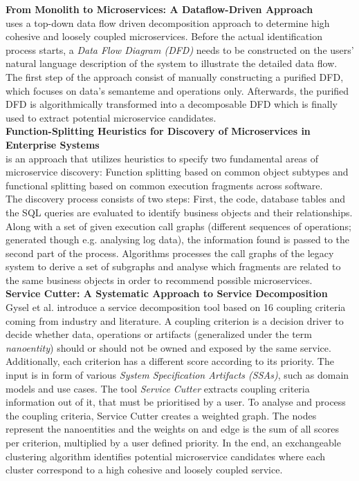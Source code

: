 \noindent
\textbf{From Monolith to Microservices: A Dataflow-Driven Approach } \\
\cite{DataflowDrivenChen} uses a top-down data flow driven decomposition approach to determine high cohesive and loosely coupled microservices. Before the actual identification process starts, a \textit{Data Flow Diagram (DFD)} needs to be constructed on the users' natural language description of the system to illustrate the detailed data flow. The first step of the approach consist of manually constructing a purified DFD, which focuses on data's semanteme and operations only. Afterwards, the purified DFD is algorithmically transformed into a decomposable DFD which is finally used to extract potential microservice candidates. \\


\noindent
\textbf{Function-Splitting Heuristics for Discovery of Microservices in Enterprise Systems  } \\
\cite{HeuristicsAlwis} is an approach that utilizes heuristics to specify two fundamental areas of microservice discovery: Function splitting based on common object subtypes and functional splitting based on common execution fragments across software. \\
The discovery process consists of two steps: First, the code, database tables and the SQL queries are evaluated to identify business objects and their relationships. Along with a set of given execution call graphs (different sequences of operations; generated though e.g. analysing log data), the information found is passed to the second part of the process. Algorithms processes the call graphs of the legacy system to derive a set of subgraphs and analyse which fragments are related to the same business objects in order to recommend possible microservices. \\

\noindent
\textbf{Service Cutter: A Systematic Approach to Service Decomposition  } \\
Gysel et al. \cite{ServiceCutter} introduce a service decomposition tool based on 16 coupling criteria coming from industry and literature. A coupling criterion is a decision driver to decide whether data, operations or artifacts (generalized under the term \textit{nanoentity}) should or should not be owned and exposed by the same service. Additionally, each criterion has a different score according to its priority.
The input is in form of various \textit{System Specification Artifacts (SSAs)}, such as domain models and use cases.  The tool \textit{Service Cutter} extracts coupling criteria information out of it, that must be prioritised by a user. To analyse and process the coupling criteria, Service Cutter creates a weighted graph. The nodes represent the nanoentities and the weights on and edge is the sum of all scores per criterion, multiplied by a user defined priority. In the end, an exchangeable clustering algorithm identifies potential microservice candidates where each cluster correspond to a high cohesive and loosely coupled service.
 
